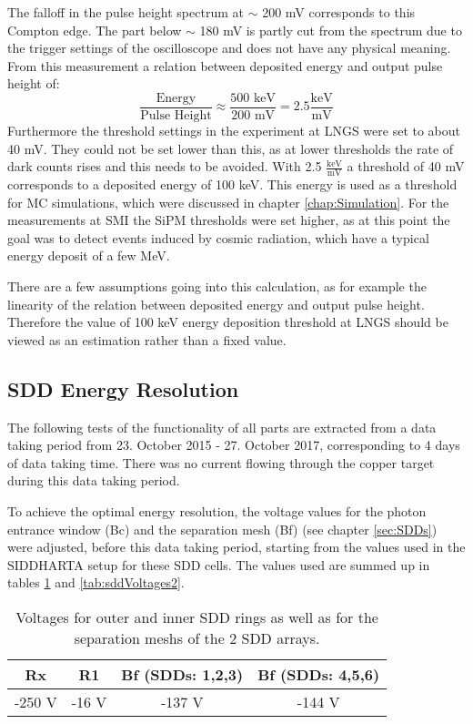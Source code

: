 The falloff in the pulse height spectrum at $\sim$ 200 mV corresponds to this Compton edge. The part below $\sim$ 180 mV is partly cut from the spectrum due to the trigger settings of the oscilloscope and does not have any physical meaning. From this measurement a relation between deposited energy and output pulse height of:
\begin{equation}
 \frac{\text{Energy}}{\text{Pulse Height}} \approx \frac{500\text{ keV}}{200\text{ mV}} = 2.5 \frac{\text{keV}}{\text{mV}}
\end{equation} 
Furthermore the threshold settings in the experiment at LNGS were set to about 40 mV. They could not be set lower than this, as at lower thresholds the rate of dark counts rises and this needs to be avoided. With 2.5 $\frac{\text{keV}}{\text{mV}}$ a threshold of 40 mV corresponds to a deposited energy of 100 keV. This energy is used as a threshold for MC simulations, which were discussed in chapter \ref{chap:Simulation}. For the measurements at SMI the SiPM thresholds were set higher, as at this point the goal was to detect events induced by cosmic radiation, which have a typical energy deposit of a few MeV.

There are a few assumptions going into this calculation, as for example the linearity of the relation between deposited energy and output pulse height. Therefore the value of 100 keV energy deposition threshold at LNGS should be viewed as an estimation rather than a fixed value.


\subsection{SDD Energy Resolution}

The following tests of the functionality of all parts are extracted from a data taking period from 23. October 2015 - 27. October 2017, corresponding to 4 days of data taking time. There was no current flowing through the copper target during this data taking period.

To achieve the optimal energy resolution, the voltage values for the photon entrance window (Bc) and the separation mesh (Bf) (see chapter \ref{sec:SDDs}) were adjusted, before this data taking period, starting from the values used in the SIDDHARTA setup for these SDD cells. The values used are summed up in tables \ref{tab:sddVoltages1} and \ref{tab:sddVoltages2}.

\begin{table}[h]
 \centering
\begin{tabular}{ |c|c|c|c| } 
 \hline
 Rx & R1 & Bf (SDDs: 1,2,3) & Bf (SDDs: 4,5,6)  \\ 
 \hline
 -250 V & -16 V & -137 V & -144 V  \\
 \hline
\end{tabular}
\caption{Voltages for outer and inner SDD rings as well as for the separation meshs of the 2 SDD arrays.}
\label{tab:sddVoltages1}
\end{table}

